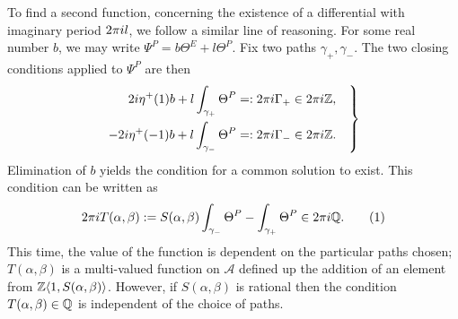 \documentclass{article}
\begin{document}
To find a second function, concerning the existence of a differential with imaginary period $2\pi i l$, we follow a similar line of reasoning. For some real number $b$, we may write $\Psi^P = b \Theta^E + l \Theta^P$. Fix two paths $\gamma_+, \gamma_-$. The two closing conditions applied to $\Psi^P$ are then
\begin{equation}
\left.
\begin{aligned}
2i \eta^+(1) b + l\int_{\gamma_+} \Theta^P &=: 2\pi i \Gamma_+ \in 2\pi i \mathbb{Z}, \\
-2i \eta^+(-1) b + l\int_{\gamma_-} \Theta^P &=: 2\pi i \Gamma_- \in 2\pi i \mathbb{Z}.
\end{aligned}
\quad
\right\}
\label{eqn:period closing cond}
\end{equation}
Elimination of $b$ yields the condition for a common solution to exist. This condition can be written as
\[
2\pi\iu T(\alpha,\beta) := S(\alpha,\beta) \int_{\gamma_-} \Theta^P - \int_{\gamma_+} \Theta^P
\in 2\pi\iu \Q.
\labelthis{eqn:def_T}
\]
This time, the value of the function is dependent on the particular paths chosen; 
$T(\alpha,\beta)$ is a multi-valued function on $\mathcal{A}$ defined up the addition of an element from $\mathbb{Z}\langle 1,S(\alpha,\beta)\rangle$.
However, if $S(\alpha,\beta)$ is rational then the condition $T(\alpha,\beta)\in\mathbb{Q}$ is independent of the choice of paths.
\end{document}
